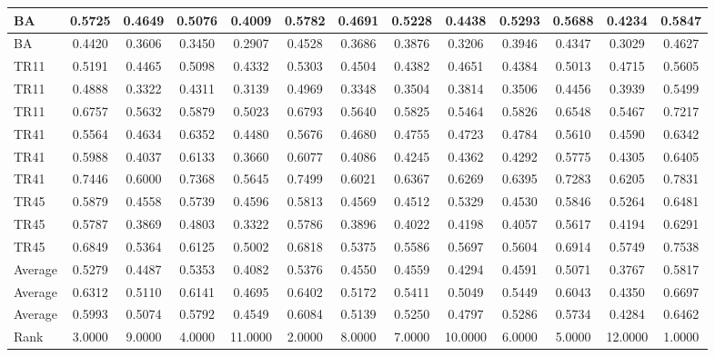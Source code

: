 \begin{tiny}
\begin{tabular}{|l|c|c|c|c|c|c|c|c|c|c|c|c|}
\textrm{BA}&0.5725&0.4649&0.5076&0.4009&0.5782&0.4691&0.5228&0.4438&0.5293&0.5688&0.4234&0.5847\\\hline
\textrm{BA}&0.4420&0.3606&0.3450&0.2907&0.4528&0.3686&0.3876&0.3206&0.3946&0.4347&0.3029&0.4627\\\hline
\textrm{TR11}&0.5191&0.4465&0.5098&0.4332&0.5303&0.4504&0.4382&0.4651&0.4384&0.5013&0.4715&0.5605\\\hline
\textrm{TR11}&0.4888&0.3322&0.4311&0.3139&0.4969&0.3348&0.3504&0.3814&0.3506&0.4456&0.3939&0.5499\\\hline
\textrm{TR11}&0.6757&0.5632&0.5879&0.5023&0.6793&0.5640&0.5825&0.5464&0.5826&0.6548&0.5467&0.7217\\\hline
\textrm{TR41}&0.5564&0.4634&0.6352&0.4480&0.5676&0.4680&0.4755&0.4723&0.4784&0.5610&0.4590&0.6342\\\hline
\textrm{TR41}&0.5988&0.4037&0.6133&0.3660&0.6077&0.4086&0.4245&0.4362&0.4292&0.5775&0.4305&0.6405\\\hline
\textrm{TR41}&0.7446&0.6000&0.7368&0.5645&0.7499&0.6021&0.6367&0.6269&0.6395&0.7283&0.6205&0.7831\\\hline
\textrm{TR45}&0.5879&0.4558&0.5739&0.4596&0.5813&0.4569&0.4512&0.5329&0.4530&0.5846&0.5264&0.6481\\\hline
\textrm{TR45}&0.5787&0.3869&0.4803&0.3322&0.5786&0.3896&0.4022&0.4198&0.4057&0.5617&0.4194&0.6291\\\hline
\textrm{TR45}&0.6849&0.5364&0.6125&0.5002&0.6818&0.5375&0.5586&0.5697&0.5604&0.6914&0.5749&0.7538\\\hline
\textrm{Average}&0.5279&0.4487&0.5353&0.4082&0.5376&0.4550&0.4559&0.4294&0.4591&0.5071&0.3767&0.5817\\\hline
\textrm{Average}&0.6312&0.5110&0.6141&0.4695&0.6402&0.5172&0.5411&0.5049&0.5449&0.6043&0.4350&0.6697\\\hline
\textrm{Average}&0.5993&0.5074&0.5792&0.4549&0.6084&0.5139&0.5250&0.4797&0.5286&0.5734&0.4284&0.6462\\\hline
\textrm{Rank}&3.0000&9.0000&4.0000&11.0000&2.0000&8.0000&7.0000&10.0000&6.0000&5.0000&12.0000&1.0000\\\hline
\end{tabular}
\end{tiny}